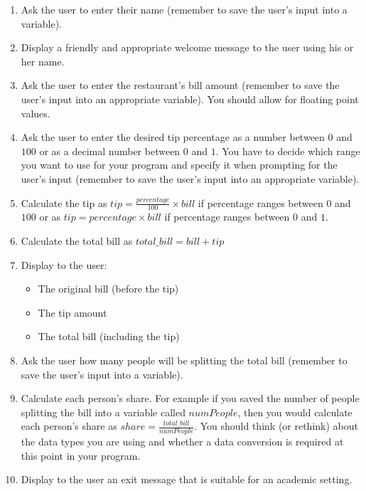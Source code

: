 \vspace*{-.1in}
\begin{enumerate}
\item Ask the user to enter their name (remember to save the user's input into a variable).
\item Display a friendly and appropriate welcome message to the user using his or her name.
\item Ask the user to enter the restaurant's bill amount (remember to save the user's input into an appropriate variable). You should allow for floating point values.
\item Ask the user to enter the desired tip percentage as a number between $0$ and $100$ or as a decimal number between
  $0$ and $1$. You have to decide which range you want to use for your program and specify it when prompting for the user's
  input (remember to save the user's input into an appropriate variable).
\item Calculate the tip as $tip = \frac{percentage}{100} \times bill$ if percentage ranges between $0$ and $100$ or as $tip = percentage \times bill$ if percentage ranges between $0$ and $1$.
\item Calculate the total bill as $total\_bill = bill+tip$
\item Display to the user:
	\begin{itemize}
		\item The original bill (before the tip)
		\item The tip amount
		\item The total bill (including the tip)
	\end{itemize}
\item Ask the user how many people will be splitting the total bill (remember to save the user's input into a variable).
\item Calculate each person's share. For example if you saved the number of people splitting the bill into a variable
  called $numPeople$, then you would calculate each person's share as $share = \frac{total\_bill}{numPeople}$. You
  should think (or rethink) about the data types you are using and whether a data conversion is required at this point
  in your program.
\item Display to the user an exit message that is suitable for an academic setting.
\end{enumerate}

